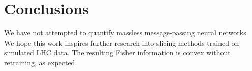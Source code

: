 \section{Conclusions}\label{sec:conclusions}

We have not attempted to quantify massless message-passing neural
networks. We hope this work inspires further research into slicing
methods trained on simulated LHC data. The resulting Fisher information
is convex without retraining, as expected.

